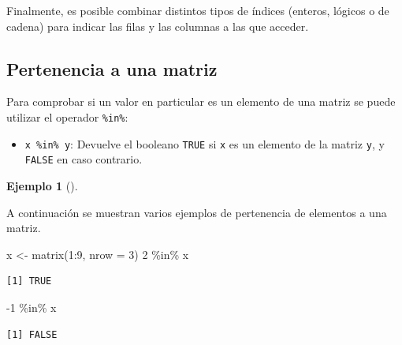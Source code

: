\documentclass[
  a4paper,
]{scrreport}
\newenvironment{Shaded}{\begin{snugshade}}{\end{snugshade}}
\newcommand{\AttributeTok}[1]{\textcolor[rgb]{0.40,0.45,0.13}{#1}}
\newcommand{\DecValTok}[1]{\textcolor[rgb]{0.68,0.00,0.00}{#1}}
\newcommand{\FunctionTok}[1]{\textcolor[rgb]{0.28,0.35,0.67}{#1}}
\newcommand{\NormalTok}[1]{\textcolor[rgb]{0.00,0.23,0.31}{#1}}
\newcommand{\OtherTok}[1]{\textcolor[rgb]{0.00,0.23,0.31}{#1}}
\newcommand{\SpecialCharTok}[1]{\textcolor[rgb]{0.37,0.37,0.37}{#1}}
\providecommand{\tightlist}{%
  \setlength{\itemsep}{0pt}\setlength{\parskip}{0pt}}\usepackage{longtable,booktabs,array}
\theoremstyle{definition}
\newtheorem{example}{Ejemplo}[chapter]
\theoremstyle{definition}
\theoremstyle{remark}
\begin{document}
Finalmente, es posible combinar distintos tipos de índices (enteros,
lógicos o de cadena) para indicar las filas y las columnas a las que
acceder.

\hypertarget{pertenencia-a-una-matriz}{%
\subsection{Pertenencia a una matriz}\label{pertenencia-a-una-matriz}}

Para comprobar si un valor en particular es un elemento de una matriz se
puede utilizar el operador \texttt{\%in\%}:

\begin{itemize}
\tightlist
\item
  \texttt{x\ \%in\%\ y}: Devuelve el booleano \texttt{TRUE} si
  \texttt{x} es un elemento de la matriz \texttt{y}, y \texttt{FALSE} en
  caso contrario.
\end{itemize}

\leavevmode{}%
\begin{example}[]\label{exm-pertenencia-matriz}

A continuación se muestran varios ejemplos de pertenencia de elementos a
una matriz.

\begin{Shaded}
\begin{Highlighting}[]
\NormalTok{x }\OtherTok{\textless{}{-}} \FunctionTok{matrix}\NormalTok{(}\DecValTok{1}\SpecialCharTok{:}\DecValTok{9}\NormalTok{, }\AttributeTok{nrow =} \DecValTok{3}\NormalTok{)}
\DecValTok{2} \SpecialCharTok{\%in\%}\NormalTok{ x}
\end{Highlighting}
\end{Shaded}

\begin{verbatim}
[1] TRUE
\end{verbatim}

\begin{Shaded}
\begin{Highlighting}[]
\SpecialCharTok{{-}}\DecValTok{1} \SpecialCharTok{\%in\%}\NormalTok{ x}
\end{Highlighting}
\end{Shaded}

\begin{verbatim}
[1] FALSE
\end{verbatim}

\end{example}
\end{document}
